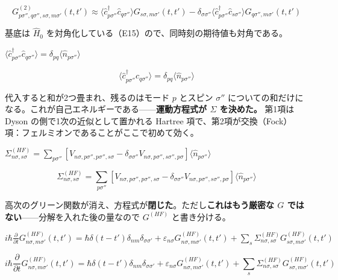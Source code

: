\documentclass[dvipdfmx,a4paper,11pt]{jsarticle}
\begin{document}
\begin{equation}
  G^{(2)}_{p\sigma'',q\sigma'',s\sigma,m\sigma'}(t,t') \approx \langle \hat c^\dagger_{p\sigma''} \hat c_{q\sigma''}\rangle G_{s\sigma,m\sigma'}(t,t') - \delta_{\sigma\sigma''} \langle \hat c^\dagger_{p\sigma''} \hat c_{s\sigma''}\rangle G_{q\sigma'',m\sigma'}(t,t')
  \label{eq:E26}
\end{equation}

基底は $\hat H_0$ を対角化している（E15）ので、同時刻の期待値も対角である。

$\langle \hat c^\dagger_{p\sigma''} \hat c_{q\sigma''}\rangle = \delta_{pq}\langle \hat n_{p\sigma''}\rangle$

\begin{equation}
  \langle \hat c^\dagger_{p\sigma''} \hat c_{q\sigma''}\rangle = \delta_{pq}\langle \hat n_{p\sigma''}\rangle
  \label{eq:E27}
\end{equation}

代入すると和が2つ畳まれ、残るのはモード $p$ とスピン $\sigma''$ についての和だけになる。これが自己エネルギーである——\textbf{運動方程式が $\Sigma$ を決めた。} 第1項は Dyson の側で1次の近似として置かれる Hartree 項で、第2項が交換（Fock）項：フェルミオンであることがここで初めて効く。

$\Sigma^{(HF)}_{n\sigma,s\sigma} = \sum_{p \sigma''}\left[V_{n\sigma,p\sigma'',p\sigma'',s\sigma} - \delta_{\sigma\sigma''}V_{n\sigma,p\sigma'',s\sigma'',p\sigma}\right]\langle \hat n_{p\sigma''} \rangle$

\begin{equation}
  \Sigma^{(HF)}_{n\sigma,s\sigma} = \sum_{p \sigma''}\left[V_{n\sigma,p\sigma'',p\sigma'',s\sigma} - \delta_{\sigma\sigma''}V_{n\sigma,p\sigma'',s\sigma'',p\sigma}\right]\langle \hat n_{p\sigma''} \rangle
  \label{eq:E28}
\end{equation}

高次のグリーン関数が消え、方程式が\textbf{閉じた}。ただし\textbf{これはもう厳密な $G$ ではない}——分解を入れた後の量なので $G^{(HF)}$ と書き分ける。

$i\hbar \frac{\partial}{\partial t} G^{(HF)}_{n\sigma,m\sigma'}(t,t') = \hbar\delta(t-t')\delta_{nm}\delta_{\sigma\sigma'} + \varepsilon_{n\sigma} G^{(HF)}_{n\sigma,m\sigma'}(t,t') + \sum_{s} \Sigma^{(HF)}_{n\sigma,s\sigma} G^{(HF)}_{s\sigma,m\sigma'}(t,t')$

\begin{equation}
  i\hbar \frac{\partial}{\partial t} G^{(HF)}_{n\sigma,m\sigma'}(t,t') = \hbar\delta(t-t')\delta_{nm}\delta_{\sigma\sigma'} + \varepsilon_{n\sigma} G^{(HF)}_{n\sigma,m\sigma'}(t,t') + \sum_{s} \Sigma^{(HF)}_{n\sigma,s\sigma} G^{(HF)}_{s\sigma,m\sigma'}(t,t')
  \label{eq:E29}
\end{equation}
\end{document}
